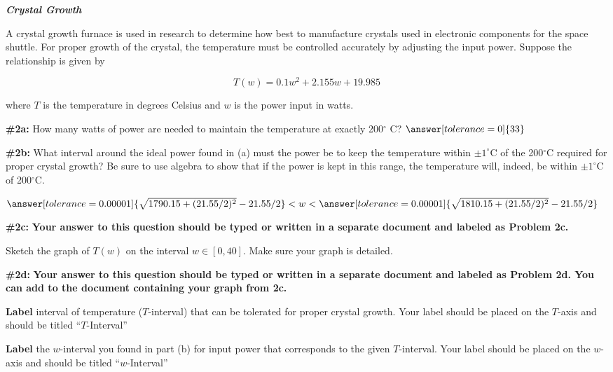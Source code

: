 \documentclass[handout,nooutcomes]{ximera}
\begin{document}
\begin{problem}{\textbf{\textit{Crystal Growth}}}

A crystal growth furnace is used in research to determine how best to manufacture crystals used in electronic components for the space shuttle.  For proper growth of the crystal, the temperature must be controlled accurately by adjusting the input power.  Suppose the relationship is given by

\[T(w)= 0.1 w^2 +2.155 w +19.985
\]

where $T$ is the temperature in degrees Celsius and $w$ is the power input in watts.
   \begin{problem}{\textbf{\#2a:}}
   How many watts of power are needed to maintain the temperature at exactly 200$^\circ$ C?
   $\answer[tolerance=0]{33}$
   \end{problem}
   
   \begin{problem}{\textbf{\#2b:}}
   What interval around the ideal power found in (a) must the power be to keep the temperature within $\pm 1^\circ$C  of the 200$^\circ$C required for proper crystal growth? Be sure to use algebra to show that if the power is kept in this range, the temperature will, indeed, be within $\pm 1^\circ$C  of 200$^\circ$C.
   
   $\answer[tolerance=0.00001]{\sqrt{1790.15+(21.55/2)^2}-21.55/2} <w< \answer[tolerance=0.00001]{\sqrt{1810.15+(21.55/2)^2}-21.55/2}$
   
   \end{problem}
   
   \begin{problem}{\textbf{\#2c:}}
   \textbf{Your answer to this question should be typed or written in a separate document and labeled as Problem 2c.}
   
   Sketch the graph of $T(w)$ on the interval $w\in[0,40]$. Make sure your graph is detailed.
   
    \end{problem}
    
    \begin{problem}{\textbf{\#2d:}}
    \textbf{Your answer to this question should be typed or written in a separate document and labeled as Problem 2d. You can add to the document containing your graph from 2c.}
    
    \textbf{Label} interval of temperature ($T$-interval) that can be tolerated for proper crystal growth. Your label should be placed on the $T$-axis and should be titled ``$T$-Interval''
    
	\textbf{Label} the $w$-interval you found in part (b) for input power that corresponds to the given $T$-interval. Your label should be placed on the $w$-axis and should be titled ``$w$-Interval''
    \end{problem}
    
\end{problem}
\end{document}
